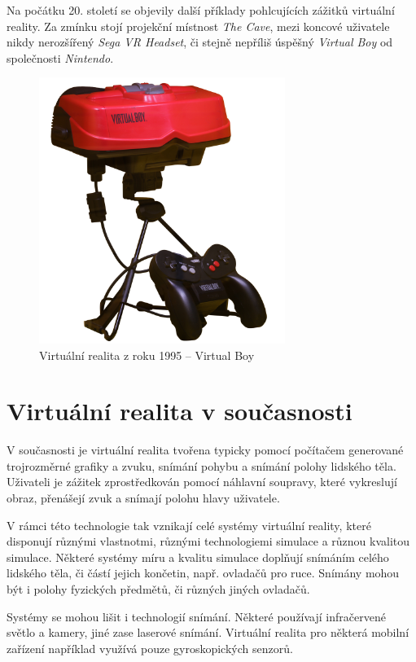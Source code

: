 Na počátku 20. století se objevily další příklady pohlcujících zážitků
virtuální reality. Za zmínku stojí projekční místnost \emph{The Cave},
mezi koncové uživatele nikdy nerozšířený \emph{Sega VR Headset}, či
stejně nepříliš úspěšný \emph{Virtual Boy} od společnosti
\emph{Nintendo}.

\begin{figure}[h!]
\centering
\includegraphics[width=8cm]{src/assets/virtual-boy.jpg}
\caption{Virtuální realita z roku 1995 -- Virtual Boy\autocite{virtualboypic}}
\end{figure}

\section{Virtuální realita v
současnosti}\label{virtuuxe1lnuxed-realita-v-souux10dasnosti}

V současnosti je virtuální realita tvořena typicky pomocí počítačem
generované trojrozměrné grafiky a zvuku, snímání pohybu a snímání polohy
lidského těla. Uživateli je zážitek zprostředkován pomocí náhlavní
soupravy, které vykreslují obraz, přenášejí zvuk a snímají polohu hlavy
uživatele.

V rámci této technologie tak vznikají celé systémy virtuální reality,
které disponují různými vlastnotmi, různými technologiemi simulace a
různou kvalitou simulace. Některé systémy míru a kvalitu simulace
doplňují snímáním celého lidského těla, či částí jejich končetin, např.
ovladačů pro ruce. Snímány mohou být i polohy fyzických předmětů, či
různých jiných ovladačů. 

Systémy se mohou lišit i technologií snímání.
Některé používají infračervené světlo a kamery, jiné zase laserové
snímání. Virtuální realita pro některá mobilní zařízení například
využívá pouze gyroskopických senzorů.

